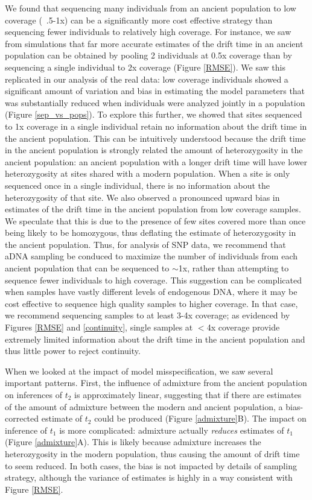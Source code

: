 \documentclass[11pt, oneside]{article}   	%
\begin{document}
We found that sequencing many individuals from an ancient population to low coverage (~.5-1x) can be a significantly more cost effective strategy than sequencing fewer individuals to relatively high coverage. For instance, we saw from simulations that far more accurate estimates of the drift time in an ancient population can be obtained by pooling 2 individuals at 0.5x coverage than by sequencing a single individual to 2x coverage (Figure \ref{RMSE}). We saw this replicated in our analysis of the real data: low coverage individuals showed a significant amount of variation and bias in estimating the model parameters that was substantially reduced when individuals were analyzed jointly in a population (Figure \ref{sep_vs_pops}). To explore this further, we showed that sites sequenced to 1x coverage in a single individual retain no information about the drift time in the ancient population. This can be intuitively understood because the drift time in the ancient population is strongly related the amount of heterozygosity in the ancient population: an ancient population with a longer drift time will have lower heterozygosity at sites shared with a modern population. When a site is only sequenced once in a single individual, there is no information about the heterozygosity of that site. We also observed a pronounced upward bias in estimates of the drift time in the ancient population from low coverage samples. We speculate that this is due to the presence of few sites covered more than once being likely to be homozygous, thus deflating the estimate of heterozygosity in the ancient population. Thus, for analysis of SNP data, we recommend that aDNA sampling be conduced to maximize the number of individuals from each ancient population that can be sequenced to $\sim$1x, rather than attempting to sequence fewer individuals to high coverage. This suggestion can be complicated when samples have vastly different levels of endogenous DNA, where it may be cost effective to sequence high quality samples to higher coverage. In that case, we recommend sequencing samples to at least 3-4x coverage; as evidenced by Figures \ref{RMSE} and \ref{continuity}, single samples at $<$4x coverage provide extremely limited information about the drift time in the ancient population and thus little power to reject continuity.

When we looked at the impact of model misspecification, we saw several important patterns. First, the influence of admixture from the ancient population on inferences of $t_2$ is approximately linear, suggesting that if there are estimates of the amount of admixture between the modern and ancient population, a bias-corrected estimate of $t_2$ could be produced (Figure \ref{admixture}B). The impact on inference of $t_1$ is more complicated: admixture actually \emph{reduces} estimates of $t_1$ (Figure \ref{admixture}A). This is likely because admixture increases the heterozygosity in the modern population, thus causing the amount of drift time to seem reduced. In both cases, the bias is not impacted by details of sampling strategy, although the variance of estimates is highly in a way consistent with Figure \ref{RMSE}. 
\end{document}
